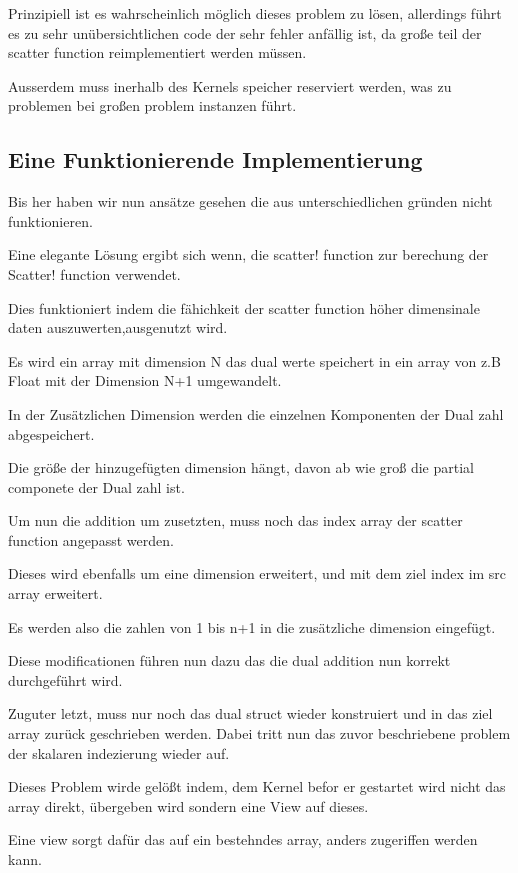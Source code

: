 Prinzipiell ist es wahrscheinlich möglich dieses problem zu lösen, 
allerdings führt es zu sehr unübersichtlichen code der sehr fehler anfällig ist, 
da große teil der scatter function reimplementiert werden müssen.

Ausserdem muss inerhalb des Kernels speicher reserviert werden, was zu problemen bei großen problem instanzen führt.


\subsection{Eine Funktionierende Implementierung}

Bis her haben wir nun ansätze gesehen die aus unterschiedlichen gründen nicht funktionieren.

Eine elegante Lösung ergibt sich wenn, 
die scatter! function zur berechung der Scatter! function verwendet.

Dies funktioniert indem die fähichkeit der scatter function höher dimensinale daten auszuwerten,ausgenutzt wird. 

Es wird ein array mit dimension N das dual werte speichert in ein array von z.B Float mit der Dimension N+1 umgewandelt. 

In der Zusätzlichen Dimension werden die einzelnen Komponenten der Dual zahl abgespeichert.

Die größe der hinzugefügten dimension hängt, davon ab wie groß die partial componete der Dual zahl ist.

Um nun die addition um zusetzten, muss noch das index array der scatter function angepasst werden.

Dieses wird ebenfalls um eine dimension erweitert, und mit dem ziel index im src array erweitert.

Es werden also die zahlen von 1 bis n+1 in die zusätzliche dimension eingefügt.

Diese modificationen führen nun dazu das die dual addition nun korrekt durchgeführt wird.

Zuguter letzt, muss nur noch das dual struct wieder konstruiert und in das ziel array zurück geschrieben werden. Dabei tritt nun das zuvor beschriebene problem der skalaren indezierung wieder auf.

Dieses Problem wirde gelößt indem, dem Kernel befor er gestartet wird nicht das array direkt, übergeben wird
sondern eine View auf dieses.

Eine view sorgt dafür das auf ein bestehndes array, anders zugeriffen werden kann.


